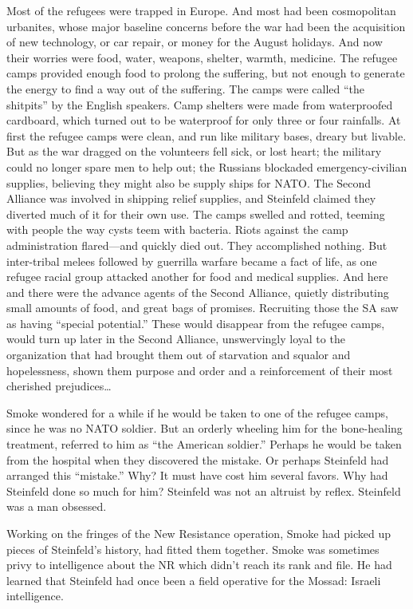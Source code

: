 Most of the refugees were trapped in Europe. And most had been cosmopolitan urbanites, whose major baseline concerns before the war had been the acquisition of new technology, or car repair, or money for the August holidays. And now their worries were food, water, weapons, shelter, warmth, medicine. The refugee camps provided enough food to prolong the suffering, but not enough to generate the energy to find a way out of the suffering. The camps were called ``the shitpits'' by the English speakers. Camp shelters were made from waterproofed cardboard, which turned out to be waterproof for only three or four rainfalls. At first the refugee camps were clean, and run like military bases, dreary but livable. But as the war dragged on the volunteers fell sick, or lost heart; the military could no longer spare men to help out; the Russians blockaded emergency-civilian supplies, believing they might also be supply ships for NATO. The Second Alliance was involved in shipping relief supplies, and Steinfeld claimed they diverted much of it for their own use. The camps swelled and rotted, teeming with people the way cysts teem with bacteria. Riots against the camp administration flared---and quickly died out. They accomplished nothing. But inter-tribal melees followed by guerrilla warfare became a fact of life, as one refugee racial group attacked another for food and medical supplies. And here and there were the advance agents of the Second Alliance, quietly distributing small amounts of food, and great bags of promises. Recruiting those the SA saw as having ``special potential.'' These would disappear from the refugee camps, would turn up later in the Second Alliance, unswervingly loyal to the organization that had brought them out of starvation and squalor and hopelessness, shown them purpose and order and a reinforcement of their most cherished prejudices\ldots

Smoke wondered for a while if he would be taken to one of the refugee camps, since he was no NATO soldier. But an orderly wheeling him for the bone-healing treatment, referred to him as ``the American soldier.'' Perhaps he would be taken from the hospital when they discovered the mistake. Or perhaps Steinfeld had arranged this ``mistake.'' Why? It must have cost him several favors. Why had Steinfeld done so much for him? Steinfeld was not an altruist by reflex. Steinfeld was a man obsessed.

Working on the fringes of the New Resistance operation, Smoke had picked up pieces of Steinfeld's history, had fitted them together. Smoke was sometimes privy to intelligence about the NR which didn't reach its rank and file. He had learned that Steinfeld had once been a field operative for the Mossad: Israeli intelligence.

